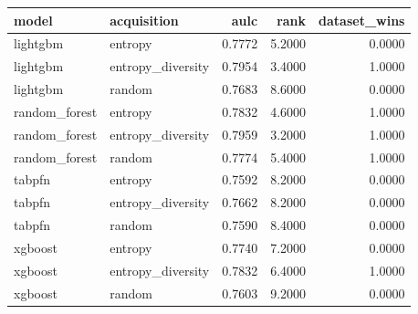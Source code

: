 \begin{tabular}{llrrr}
\toprule
model & acquisition & aulc & rank & dataset_wins \\
\midrule
lightgbm & entropy & 0.7772 & 5.2000 & 0.0000 \\
lightgbm & entropy_diversity & 0.7954 & 3.4000 & 1.0000 \\
lightgbm & random & 0.7683 & 8.6000 & 0.0000 \\
random_forest & entropy & 0.7832 & 4.6000 & 1.0000 \\
random_forest & entropy_diversity & 0.7959 & 3.2000 & 1.0000 \\
random_forest & random & 0.7774 & 5.4000 & 1.0000 \\
tabpfn & entropy & 0.7592 & 8.2000 & 0.0000 \\
tabpfn & entropy_diversity & 0.7662 & 8.2000 & 0.0000 \\
tabpfn & random & 0.7590 & 8.4000 & 0.0000 \\
xgboost & entropy & 0.7740 & 7.2000 & 0.0000 \\
xgboost & entropy_diversity & 0.7832 & 6.4000 & 1.0000 \\
xgboost & random & 0.7603 & 9.2000 & 0.0000 \\
\bottomrule
\end{tabular}
